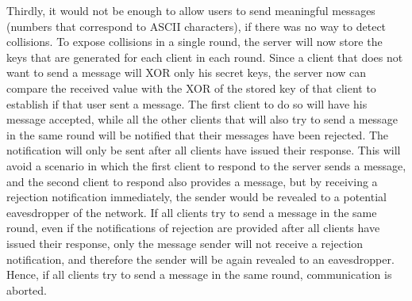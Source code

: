 Thirdly, it would not be enough to allow users to send meaningful messages (numbers that correspond to ASCII characters), if there was no way to detect collisions. To expose collisions in a single round, the server will now store the keys that are generated for each client in each round. Since a client that does not want to send a message will XOR only his secret keys, the server now can compare the received value with the XOR of the stored key of that client to establish if that user sent a message. The first client to do so will have his message accepted, while all the other clients that will also try to send a message in the same round will be notified that their messages have been rejected. The notification will only be sent after all clients have issued their response. This will avoid a scenario in which the first client to respond to the server sends a message, and the second client to respond also provides a message, but by receiving a rejection notification immediately, the sender would be revealed to a potential eavesdropper of the network. If all clients try to send a message in the same round, even if the notifications of rejection are provided after all clients have issued their response, only the message sender will not receive a rejection notification, and therefore the sender will be again revealed to an eavesdropper. Hence, if all clients try to send a message in the same round, communication is aborted.

